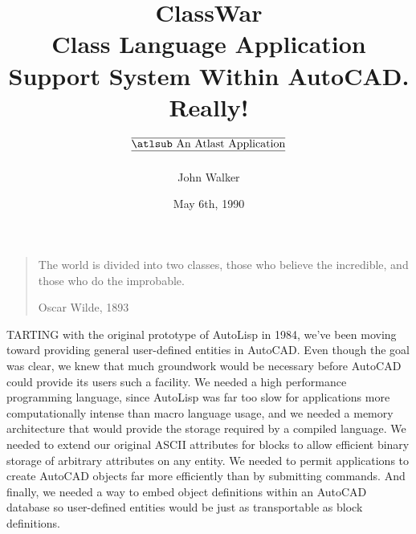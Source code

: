 \documentclass{article}
\begin{document}
\title{ClassWar \\
\vspace{10pt}
{\LARGE \sf Class Language Application Support System Within AutoCAD\@.
Really!} \\
\vspace{10pt}
$\overline{\makebox{\underline{\atlsub An Atlast Application}}}$
}

\author{John Walker}
\date{May 6th, 1990}

\maketitle


\newcommand{\atlas}{\underline{\underline{\sc Atlast}}}
\newcommand{\cw}{{\sc ClassWar}}

\begin{quote}
    The world is divided into two classes, those who believe the
    incredible, and those who do the improbable.

\vspace{-1ex}
\raggedleft
{\sc Oscar Wilde, 1893}
\end{quote}

TARTING {\sc with the original} prototype of AutoLisp in
1984, we've been moving toward providing general user-defined entities
in AutoCAD\@.  Even though the goal was clear, we knew that much
groundwork would be necessary before AutoCAD could provide its users
such a facility.  We needed a high performance programming language,
since AutoLisp was far too slow for applications more computationally
intense than macro language usage, and we needed a memory architecture
that would provide the storage required by a compiled language.  We
needed to extend our original ASCII attributes for blocks to allow
efficient binary storage of arbitrary attributes on any entity.  We
needed to permit applications to create AutoCAD objects far more
efficiently than by submitting commands.  And finally, we
needed a way to embed object definitions within an AutoCAD database so
user-defined entities would be just as transportable as block
definitions.
\end{document}
